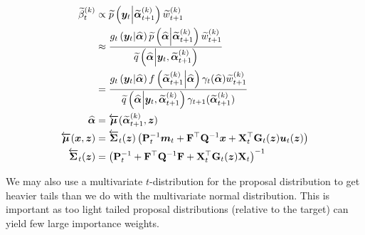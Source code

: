\documentclass[notitlepage]{article}
\renewcommand{\vec}[1]{\bm{#1}}
\newcommand{\vecLarrow}[1]{\overleftarrow{\vec{#1}}}
\newcommand{\mat}[1]{\mathbf{#1}}
\newcommand{\matLarrow}[1]{\overleftarrow{\mat{#1}}}
\newcommand{\Lparen}[1]{\left( #1\right)}
\newcommand{\Cond}[2]{ #1 \middle\vert  #2}
\newcommand{\optor}[2]{#1\Lparen{#2}}
\newcommand{\optorC}[3]{\optor{#1}{\Cond{#2}{#3}}}
\newcommand{\pdenstC}[2]{\optorC{\widetilde p}{#1}{#2}}
\newcommand{\IDAproxC}[2]{\optorC{\widetilde{q}}{#1}{#2}}
\newcommand{\particB}[3]{\widetilde{#1}_{#2}^{\Lparen{#3}}}
\begin{document}
\begin{align}
\particB{\beta}{t}{k} &\propto %
		\pdenstC{\vec{y}_t}{\particB{\vec\alpha}{t + 1}k}
		\particB w{t + 1}k\nonumber\\
	&\approx \frac{ %
		\optorC{g_t}{\vec{y}_t}{\widehat{\vec\alpha}}
		\pdenstC{\widehat{\vec\alpha}}{\particB{\vec{\alpha}}{t + 1}k}
		\particB w{t + 1}k
	}{%
		\IDAproxC{\widehat{\vec\alpha}}{\vec y_t, 
			\particB{\vec{\alpha}}{t + 1}k}
	}\nonumber\\
&= \frac{ %
		\optorC{g_t}{\vec{y}_t}{\widehat{\vec\alpha}}
		\optorC{f}{\particB{\vec{\alpha}}{t + 1}k}{\widehat{\vec\alpha}}
		\gamma_t(\widehat{\vec\alpha})
		\particB w{t + 1}k
	}{%
		\IDAproxC{\widehat{\vec\alpha}}{\vec y_t, 
			\particB{\vec{\alpha}}{t + 1}k}
		\gamma_{t+1}(\particB{\vec{\alpha}}{t + 1}k)
	}\label{eq:bwResampleW}\\
\widehat{\vec\alpha} &= 
	\vecLarrow\mu (\particB{\vec{\alpha}}{t + 1}k, \vec z)\nonumber\\
\vecLarrow\mu (\vec x, \vec z)
	&= \matLarrow\Sigma_t(\vec z)\Lparen{
	\mat P_t^{-1}\vec m_t + \mat F^\top \mat Q^{-1}\vec x + 
	\mat X_t^\top\mat G_t(\vec z)\vec u_t(\vec z)} \label{eq:bwPropBackMean}\\
\matLarrow\Sigma_t(\vec z) &= 
	\Lparen{\mat P_t^{-1} + \mat F^\top\mat Q^{-1}\mat F + 
		\mat X_t^\top \mat G_t(\vec z) \mat X_t}^{-1} \label{eq:bwPropBackCov} 
\end{align}

We may also use a multivariate $t$-distribution for the proposal distribution to get heavier
tails than we do with the multivariate normal distribution. This is important as too light tailed 
proposal distributions (relative to the target) can yield few large importance weights.
\end{document}
